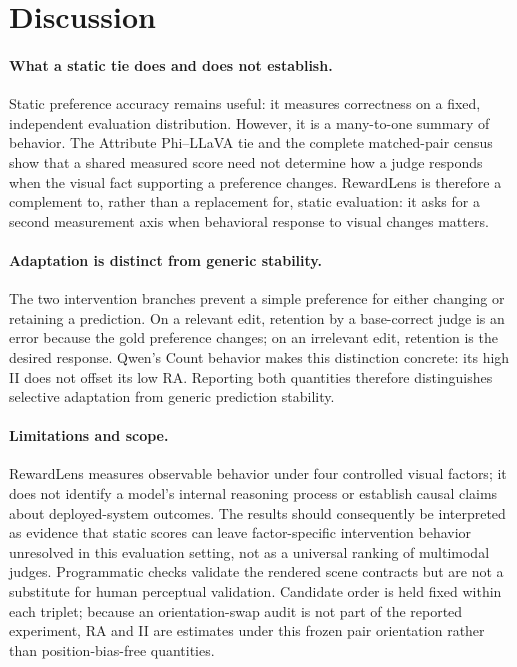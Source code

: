 \section{Discussion}
\label{sec:discussion}

\paragraph{What a static tie does and does not establish.}
Static preference accuracy remains useful: it measures correctness on a fixed,
independent evaluation distribution. However, it is a many-to-one summary of
behavior. The Attribute Phi--LLaVA tie and the complete matched-pair census show
that a shared measured score need not determine how a judge responds when the
visual fact supporting a preference changes. RewardLens is therefore a
complement to, rather than a replacement for, static evaluation: it asks for a
second measurement axis when behavioral response to visual changes matters.

\paragraph{Adaptation is distinct from generic stability.}
The two intervention branches prevent a simple preference for either changing
or retaining a prediction. On a relevant edit, retention by a base-correct
judge is an error because the gold preference changes; on an irrelevant edit,
retention is the desired response. Qwen's Count behavior makes this distinction
concrete: its high II does not offset its low RA. Reporting both quantities
therefore distinguishes selective adaptation from generic prediction stability.

\paragraph{Limitations and scope.}
RewardLens measures observable behavior under four controlled visual factors;
it does not identify a model's internal reasoning process or establish causal
claims about deployed-system outcomes. The results should consequently be
interpreted as evidence that static scores can leave factor-specific
intervention behavior unresolved in this evaluation setting, not as a universal
ranking of multimodal judges. Programmatic checks validate the rendered scene
contracts but are not a substitute for human perceptual validation. Candidate
order is held fixed within each triplet; because an orientation-swap audit is
not part of the reported experiment, RA and II are estimates under this frozen
pair orientation rather than position-bias-free quantities.
